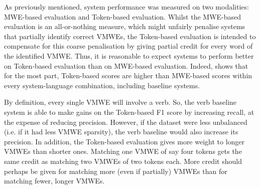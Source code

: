 \documentclass[output=paper,modfonts,nonflat,draftmode]{langsci/langscibook}
\begin{document}

As previously mentioned, system performance was measured on two modalities: MWE-based evaluation and Token-based evaluation. Whilst the MWE-based evaluation is an all-or-nothing measure, which might unfairly penalise systems that partially identify correct VMWEs, the Token-based evaluation is intended to compensate for this coarse penalisation by giving partial credit for every word of the identified VMWE. Thus, it is reasonable to expect systems to perform better on Token-based evaluation than on MWE-based evaluation. Indeed,  shows that for the most part, Token-based scores are higher than MWE-based scores within every system-language combination, including baseline systems.

By definition, every single VMWE will involve a verb. So, the verb baseline system is able to make gains on the Token-based F1 score by increasing recall, at the expense of reducing precision. However, if the dataset were less unbalanced (i.e. if it had less VMWE sparsity), the verb baseline would also increase its precision. In addition, the Token-based evaluation gives more weight to longer VMWEs than shorter ones. Matching one VMWE of say four tokens gets the same credit as matching two VMWEs of two tokens each. More credit should perhaps be given for matching more (even if partially) VMWEs than for matching fewer, longer VMWEs. 

\end{document}
